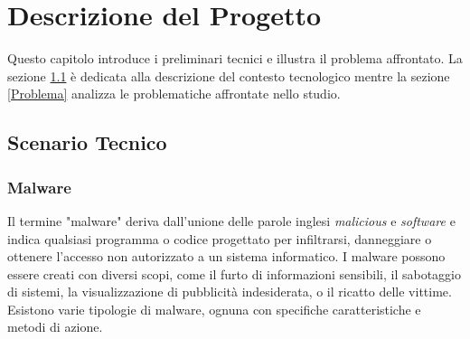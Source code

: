 \chapter{Descrizione del Progetto}
\label{cap:descrizione}
Questo capitolo introduce i preliminari tecnici e illustra il problema affrontato. La sezione \ref{Scenario} è dedicata alla descrizione del contesto tecnologico mentre la sezione \ref{Problema} analizza le problematiche affrontate nello studio. 

\section{Scenario Tecnico}
\label{Scenario}

\subsection{Malware}
Il termine "malware" deriva dall'unione delle parole inglesi \emph{malicious} e \emph{software}\cite{site:malware} e indica qualsiasi programma o codice progettato per infiltrarsi, danneggiare o ottenere l'accesso non autorizzato a un sistema informatico. I malware possono essere creati con diversi scopi, come il furto di informazioni sensibili, il sabotaggio di sistemi, la visualizzazione di pubblicità indesiderata, o il ricatto delle vittime. Esistono varie tipologie di malware, ognuna con specifiche caratteristiche e metodi di azione.

